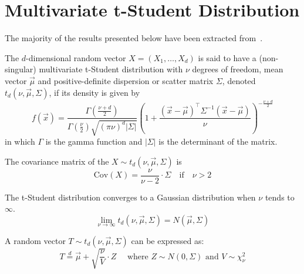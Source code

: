 \documentclass[11pt,fleqn]{book} %
\begin{document}
\section{Multivariate t-Student Distribution}
\label{ap:mtsd}

The majority of the results presented below have been extracted 
from~\cite{kotz:2004,demarta:2005}.

\begin{definition}
	The $d$-dimensional random vector $X=(X_1,\dots,X_d)$ is said to have a 
	(non-singular) multivariate t-Student distribution with $\nu$ degrees of 
	freedom, mean vector $\vec{\mu}$ and positive-definite dispersion or 
	scatter matrix $\Sigma$, denoted $t_d(\nu,\vec{\mu},\Sigma)$, if its 
	density is given by
	\begin{displaymath}
		f(\vec{x})=\frac{\Gamma\left(\frac{\nu+d}{2}\right)}
		{\Gamma\left(\frac{\nu}{2}\right)\sqrt{(\pi \nu)^d |\Sigma|}}
		\left(
		1+ \frac{(\vec{x}-\vec{\mu})^\top\Sigma^{-1}(\vec{x}-\vec{\mu})}{\nu}
		\right)^{-\frac{\nu+d}{2}}
	\end{displaymath}
	in which $\Gamma$ is the gamma function and $|\Sigma|$ is the 
	determinant of the matrix.
\end{definition}

\begin{proposition}
	The covariance matrix of the $X \sim t_d(\nu,\vec{\mu},\Sigma)$ is
	\begin{displaymath}
		\text{Cov}(X) = \frac{\nu}{\nu-2} \cdot \Sigma \quad \text{if} 
		\quad \nu > 2
	\end{displaymath}
\end{proposition}

\begin{proposition}
	The t-Student distribution converges to a Gaussian distribution 
	when $\nu$ tends to $\infty$.
	\begin{displaymath}
		\lim_{\nu \to \infty} t_d(\nu,\vec{\mu},\Sigma) = N(\vec{\mu},\Sigma)
	\end{displaymath}
\end{proposition}

\begin{proposition}
	\label{prop:mtschar}
	A random vector $T \sim t_d(\nu,\vec{\mu},\Sigma)$ can be expressed as:
	\begin{displaymath}
		T \stackrel{d}{=} \vec{\mu} + \sqrt{\frac{\nu}{V}}\cdot Z
		\quad \text{ where } Z \sim N(0,\Sigma) \text{ and } V \sim \chi_{\nu}^2
	\end{displaymath}
\end{proposition}
\end{document}
